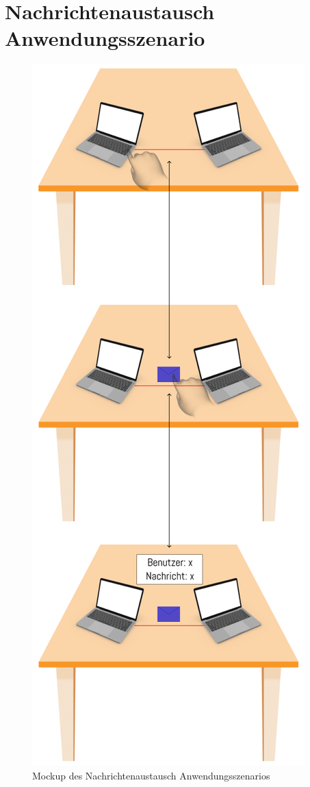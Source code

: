 \section{Nachrichtenaustausch Anwendungsszenario}
\begin{figure}[htbp]
    \centering
    \includegraphics[scale=0.75]{images/NachrichtenaustauschMockup}
    \caption{Mockup des Nachrichtenaustausch Anwendungsszenarios}
\end{figure}
\newpage

